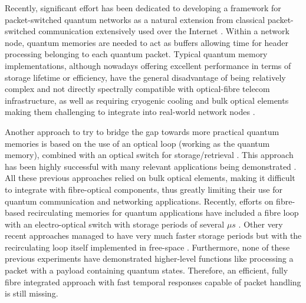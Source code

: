 \documentclass[%
reprint,
superscriptaddress,
 amsmath,amssymb,
 aps,
 prx,
floatfix,
]{revtex4-2}
\begin{document}
Recently, significant effort has been dedicated to developing a framework for packet-switched quantum networks as a natural extension from classical packet-switched communication extensively used over the Internet \cite{DiAdamo2022, Mandil2023, Yoo2024}.  Within a network node, quantum memories \cite{lvovsky2009memory,heshami2016memories,bussieres2013applications} are needed to act as buffers allowing time for header processing belonging to each quantum packet. Typical quantum memory implementations, although nowadays offering excellent performance in terms of storage lifetime or efficiency, have the general disadvantage of being relatively complex and not directly spectrally compatible with optical-fibre telecom infrastructure, as well as requiring cryogenic cooling and bulk optical elements making them challenging to integrate into real-world network nodes \cite{Ortu2022, Duranti2024}. 

Another approach to try to bridge the gap towards more practical quantum memories is based on the use of an optical loop (working as the quantum memory), combined with an optical switch for storage/retrieval \cite{Pittman2002}. This approach has been highly successful with many relevant applications being demonstrated \cite{Makino2016, Kaneda2017, Kaneda2019, Meyer-Scott2022, Hou2023, Weinbrenner2024, Hanamura2025, Pang2023, Bonsma-Fisher2023, Bonsma-Fisher:24}. All these previous approaches relied on bulk optical elements, making it difficult to integrate with fibre-optical components, thus greatly limiting their use for quantum communication and networking applications. Recently, efforts on fibre-based recirculating memories for quantum applications have included a fibre loop with an electro-optical switch with storage periods of several $\mu s$ \cite{FookLee2024}. Other very recent approaches managed to have very much faster storage periods but with the recirculating loop itself implemented in free-space \cite{Evans2023, Cheng2025, Sun2025}. Furthermore, none of these previous experiments have demonstrated higher-level functions like processing a packet with a payload containing quantum states. Therefore, an efficient, fully fibre integrated approach with fast temporal responses capable of packet handling is still missing. 
\end{document}
